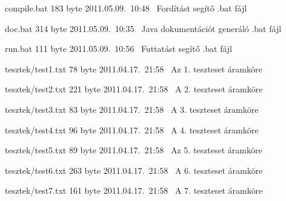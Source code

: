 \begin{fajllista}
\fajl
{compile.bat}
{183 byte}
{2011.05.09.~10:48~}
{Fordítást segítő .bat fájl}

\fajl
{doc.bat}
{314 byte}
{2011.05.09.~10:35~}
{Java dokumentációt generáló .bat fájl}

\fajl
{run.bat}
{111 byte}
{2011.05.09.~10:56~}
{Futtatást segítő .bat fájl}

\fajl
{tesztek/test1.txt} %
{78 byte} %
{2011.04.17.~21:58~} %
{Az 1. teszteset áramköre} %

\fajl
{tesztek/test2.txt} %
{221 byte} %
{2011.04.17.~21:58~} %
{A 2. teszteset áramköre} %

\fajl
{tesztek/test3.txt} %
{83 byte} %
{2011.04.17.~21:58~} %
{A 3. teszteset áramköre} %

\fajl
{tesztek/test4.txt} %
{96 byte} %
{2011.04.17.~21:58~} %
{A 4. teszteset áramköre} %

\fajl
{tesztek/test5.txt} %
{89 byte} %
{2011.04.17.~21:58~} %
{Az 5. teszteset áramköre} %

\fajl
{tesztek/test6.txt} %
{263 byte} %
{2011.04.17.~21:58~} %
{A 6. teszteset áramköre} %

\fajl
{tesztek/test7.txt} %
{161 byte} %
{2011.04.17.~21:58~} %
{A 7. teszteset áramköre} %

\end{fajllista}

